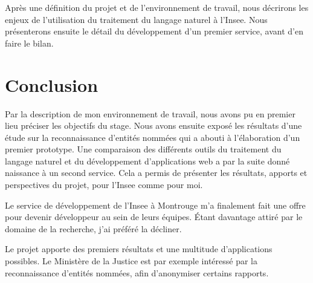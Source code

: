 \documentclass[11pt, oneside, a4paper, titlepage, french]{article}
\begin{document}
Après une définition du projet et de l'environnement de travail, nous décrirons les enjeux de l'utilisation du traitement du langage naturel à l'Insee. Nous présenterons ensuite le détail du développement d'un premier service, avant d'en faire le bilan.
\newpage


\newpage

\newpage

\newpage

\newpage

\section*{Conclusion}
Par la description de mon environnement de travail, nous avons pu en premier lieu préciser les objectifs du stage. Nous avons ensuite exposé les résultats d'une étude sur la reconnaissance d'entités nommées qui a abouti à l'élaboration d'un premier prototype. Une comparaison des différents outils du traitement du langage naturel et du développement d'applications web a par la suite donné naissance à un second service. Cela a permis de présenter les résultats, apports et perspectives du projet, pour l'Insee comme pour moi.
\newline

Le service de développement de l'Insee à Montrouge m'a finalement fait une offre pour devenir développeur au sein de leurs équipes. Étant davantage attiré par le domaine de la recherche, j'ai préféré la décliner.
\newline

Le projet apporte des premiers résultats et une multitude d'applications possibles. Le Ministère de la Justice est par exemple intéressé par la reconnaissance d'entités nommées, afin d'anonymiser certains rapports.
\newpage

\listoffigures
\vspace{20pt}
\listoftables
\newpage



\newpage


\end{document}
